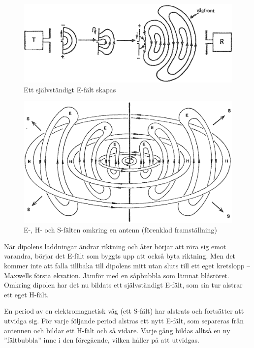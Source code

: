 \begin{figure}
\includegraphics[width=\textwidth]{images/cropped_pdfs/bild_2_7-04.pdf}
\caption{Ett självständigt E-fält skapas}
\label{fig:BildII7-04}
\end{figure}

\begin{figure}
\includegraphics[width=\textwidth]{images/cropped_pdfs/bild_2_7-05.pdf}
\caption{E-, H- och S-fälten omkring en antenn (förenklad framställning)}
\label{fig:BildII7-05}
\end{figure}

När dipolens laddningar ändrar riktning och åter börjar att röra sig
emot varandra, börjar det E-fält som byggts upp att också byta riktning.
Men det kommer inte att falla tillbaka till dipolens mitt
utan sluts till ett eget kretslopp -- Maxwells första ekvation.
Jämför med en såpbubbla som lämnat blåsröret.
Omkring dipolen har det nu bildats ett självständigt E-fält, som sin tur
alstrar ett eget H-fält.

En period av en elektromagnetisk våg (ett S-fält) har alstrats och
fortsätter att utvidga sig.
För varje följande period alstras ett nytt E-fält, som separeras från antennen
och bildar ett H-fält och så vidare.
Varje gång bildas alltså en ny ''fältbubbla'' inne i den föregående, vilken
håller på att utvidgas.

